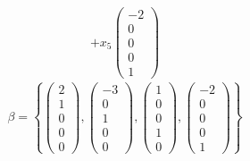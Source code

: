 \begin{enumerate}
\begin{align}
+x_5\begin{pmatrix}-2\\0\\0\\0\\1\end{pmatrix}
\end{align}
\begin{equation}
\beta =\left\{\begin{pmatrix}2\\1\\0\\0\\0\end{pmatrix},
\begin{pmatrix}-3\\0\\1\\0\\0\end{pmatrix},
\begin{pmatrix}1\\0\\0\\1\\0\end{pmatrix},
\begin{pmatrix}-2\\0\\0\\0\\1\end{pmatrix}\right\}
\end{equation}

\end{enumerate}
